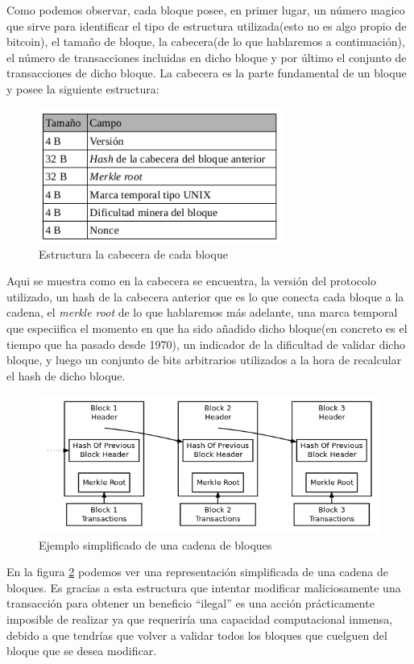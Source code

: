 \documentclass[11pt,a4paper]{article}
\begin{document}
Como podemos observar, cada bloque posee, en primer lugar, un número magico que sirve para identificar el tipo de estructura utilizada(esto no es algo propio de bitcoin), el tamaño de bloque, la cabecera(de lo que hablaremos a continuación), el número de transacciones incluidas en dicho bloque y por último el conjunto de transacciones de dicho bloque. La cabecera es la parte fundamental de un bloque y posee la siguiente estructura:\\

\begin{figure}[h]
	\includegraphics[width=8cm]{headerstructure.png}
	\centering		
	\caption{Estructura la cabecera de cada bloque}
	\label{p2}
\end{figure}

Aqui se muestra como en la cabecera se encuentra, la versión del protocolo utilizado, un hash de la cabecera anterior que es lo que conecta cada bloque a la cadena, el \emph{merkle root} de lo que hablaremos más adelante, una marca temporal que especiifica el momento en que ha sido añadido dicho bloque(en concreto es el tiempo que ha pasado desde 1970), un indicador de la dificultad de validar dicho bloque, y luego un conjunto de bits arbitrarios utilizados a la hora de recalcular el hash de dicho bloque.

\begin{figure}[h]
	\includegraphics[width=12cm]{blockchain.png}
	\centering		
	\caption{Ejemplo simplificado de una cadena de bloques}
	\label{p3}
\end{figure}

En la figura \ref{p3} podemos ver una representación simplificada de una cadena de bloques. Es gracias a esta estructura que intentar modificar maliciosamente una transacción para obtener un beneficio ``ilegal'' es una acción prácticamente imposible de realizar ya que requeriría una capacidad computacional inmensa, debido a que tendrías que volver a validar todos los bloques que cuelguen del bloque que se desea modificar.\\
\end{document}
